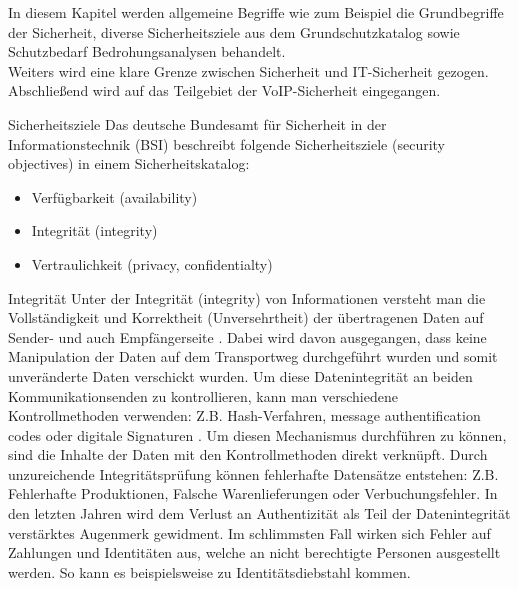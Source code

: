 \label{Grundlagen der IT-Sicherheit}
 In diesem Kapitel werden allgemeine Begriffe wie zum Beispiel die Grundbegriffe der
 Sicherheit, diverse Sicherheitsziele aus dem Grundschutzkatalog sowie Schutzbedarf 
 Bedrohungsanalysen behandelt. 
 \\
 Weiters wird eine klare Grenze zwischen Sicherheit und IT-Sicherheit gezogen. 
 Abschließend wird auf das Teilgebiet der VoIP-Sicherheit eingegangen.
 \\

 \label{Sicherheitsziele}
 \begin{section}{Sicherheitsziele}
  Das deutsche Bundesamt für Sicherheit in der Informationstechnik (BSI) beschreibt 
  folgende Sicherheitsziele (security objectives) in einem Sicherheitskatalog: 
  \cite{BSIBedarf}
  \begin{itemize}
   \item Verfügbarkeit (availability)
   \item Integrität (integrity)
   \item Vertraulichkeit (privacy, confidentialty)
  \end{itemize}
  \pagebreak

   \label{Integrität}
   \begin{subsection}{Integrität}
    Unter der Integrität (integrity) \cite{BSIa} von Informationen versteht man die Vollständigkeit und 
    Korrektheit (Unversehrtheit) der übertragenen Daten auf Sender- und auch Empfängerseite \cite{BSIInfosi}. 
    Dabei wird davon ausgegangen, dass keine Manipulation der Daten auf dem Transportweg 
    durchgeführt wurden und somit unveränderte Daten verschickt wurden. Um diese 
    Datenintegrität an beiden Kommunikationsenden zu kontrollieren, kann man verschiedene 
    Kontrollmethoden verwenden: \ac{Z.B.} Hash-Verfahren, message authentification codes 
    oder digitale Signaturen \cite{BSIBegriffe1}. Um diesen Mechanismus durchführen zu können, sind die Inhalte 
    der Daten mit den Kontrollmethoden direkt verknüpft. 
    Durch unzureichende Integritätsprüfung können fehlerhafte Datensätze entstehen: Z.B. 
    Fehlerhafte Produktionen, Falsche Warenlieferungen oder Verbuchungsfehler. 
    In den letzten Jahren wird dem Verlust an Authentizität als Teil der Datenintegrität 
    verstärktes Augenmerk gewidment. 
    Im schlimmsten Fall wirken sich Fehler auf Zahlungen und Identitäten aus, welche an 
    nicht berechtigte Personen ausgestellt werden. So kann es beispielsweise zu 
    Identitätsdiebstahl kommen.    
    \\
   \end{subsection}
   

\end{section}
